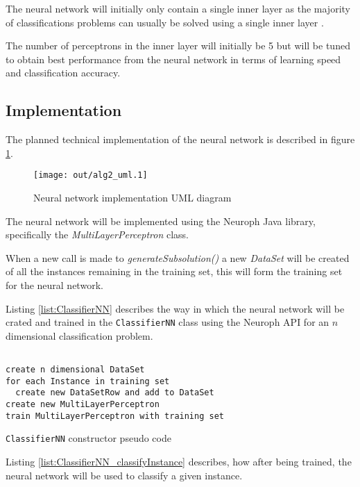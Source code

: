 \documentclass[a4paper]{article}
\begin{document}
The neural network will initially only contain a single inner layer as the
majority of classifications problems can usually be solved using a single inner
layer \cite{nninjava}.

The number of perceptrons in the inner layer will initially be 5 but will be
tuned to obtain best performance from the neural network in terms of learning
speed and classification accuracy.

\subsection{Implementation}

The planned technical implementation of the neural network is described in
figure \ref{fig:alg2_uml}.

\begin{figure}[h!]
  \centering
  \texttt{[image: out/alg2\_uml.1]}
  \caption{Neural network implementation UML diagram}
  \label{fig:alg2_uml}
\end{figure}

The neural network will be implemented using the Neuroph \cite{neuroph} Java
library, specifically the \textit{MultiLayerPerceptron} class.

When a new call is made to \textit{generateSubsolution()} a new \textit{DataSet}
will be created of all the instances remaining in the training set, this will
form the training set for the neural network.

Listing \ref{list:ClassifierNN} describes the way in which the neural network
will be crated and trained in the \texttt{ClassifierNN} class using the Neuroph
API for an $n$ dimensional classification problem.

\begin{listing}[H]
  \begin{verbatim}

create n dimensional DataSet
for each Instance in training set
  create new DataSetRow and add to DataSet
create new MultiLayerPerceptron
train MultiLayerPerceptron with training set

  \end{verbatim}
  \caption{\texttt{ClassifierNN} constructor pseudo code}
  \label{list:ClassifierNN}
\end{listing}

Listing \ref{list:ClassifierNN_classifyInstance} describes, how after being
trained, the neural network will be used to classify a given instance.
\end{document}
